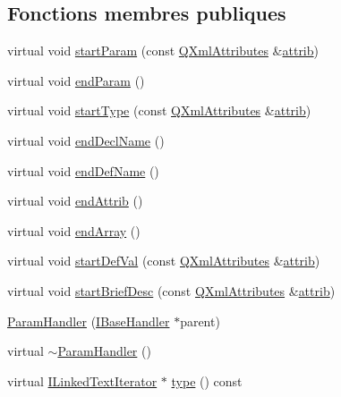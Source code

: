 \subsection*{Fonctions membres publiques}
\begin{DoxyCompactItemize}
\item 
virtual void \hyperlink{class_param_handler_a28c5affc781dfe5d43fe488f352bec45}{start\+Param} (const \hyperlink{class_q_xml_attributes}{Q\+Xml\+Attributes} \&\hyperlink{class_param_handler_aa1f1e40c4f09fd5d8dde75195dc2c558}{attrib})
\item 
virtual void \hyperlink{class_param_handler_a8270c8313e33ca775ad25487deefda04}{end\+Param} ()
\item 
virtual void \hyperlink{class_param_handler_a715809c54ff697acbf3a95fbc863dfcd}{start\+Type} (const \hyperlink{class_q_xml_attributes}{Q\+Xml\+Attributes} \&\hyperlink{class_param_handler_aa1f1e40c4f09fd5d8dde75195dc2c558}{attrib})
\item 
virtual void \hyperlink{class_param_handler_aa5b8170b1c24489f40717647311245c6}{end\+Decl\+Name} ()
\item 
virtual void \hyperlink{class_param_handler_a46f9f6a05c9c4334dae2b0f27fa5cda5}{end\+Def\+Name} ()
\item 
virtual void \hyperlink{class_param_handler_ad60c870e6d05e978d68d0abe7107fb66}{end\+Attrib} ()
\item 
virtual void \hyperlink{class_param_handler_adaec8cb8d80e5637b16518f7c8a457a5}{end\+Array} ()
\item 
virtual void \hyperlink{class_param_handler_a08411dc6c5c69cee3c40139528db7d7a}{start\+Def\+Val} (const \hyperlink{class_q_xml_attributes}{Q\+Xml\+Attributes} \&\hyperlink{class_param_handler_aa1f1e40c4f09fd5d8dde75195dc2c558}{attrib})
\item 
virtual void \hyperlink{class_param_handler_a90e1d8d302c14ffaf16660c8bc315d32}{start\+Brief\+Desc} (const \hyperlink{class_q_xml_attributes}{Q\+Xml\+Attributes} \&\hyperlink{class_param_handler_aa1f1e40c4f09fd5d8dde75195dc2c558}{attrib})
\item 
\hyperlink{class_param_handler_a97e9b8f9eb59ad8fd65589a481aa98c9}{Param\+Handler} (\hyperlink{class_i_base_handler}{I\+Base\+Handler} $\ast$parent)
\item 
virtual \hyperlink{class_param_handler_a0c850ff463de00c2ef078653ee123fd2}{$\sim$\+Param\+Handler} ()
\item 
virtual \hyperlink{class_i_linked_text_iterator}{I\+Linked\+Text\+Iterator} $\ast$ \hyperlink{class_param_handler_ac9a28ea54bfdcfebf8b010f64d37b436}{type} () const 

\end{DoxyCompactItemize}
